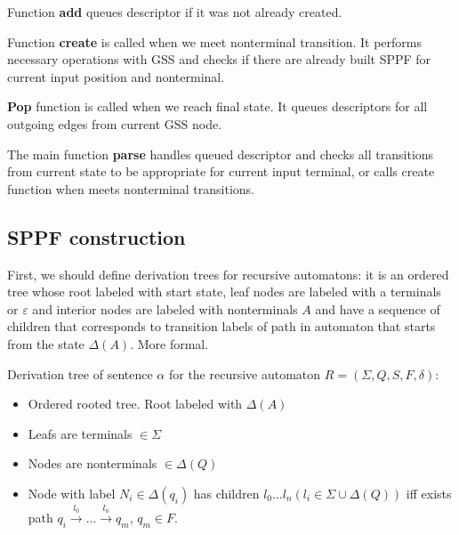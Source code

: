 \documentclass[runningheads,a4paper]{llncs}
\begin{document}

Function \textbf{add} queues descriptor if it was not already created.


Function \textbf{create} is called when we meet nonterminal transition.
It performs necessary operations with GSS and checks if there are already built SPPF for current
input position and nonterminal.

\textbf{Pop} function is called when we reach final state. It queues descriptors for all outgoing edges from current GSS node.



The main function \textbf{parse} handles queued descriptor and checks all transitions from current state to be appropriate
for current input terminal, or calls create function when meets nonterminal transitions.


\subsection{SPPF construction}

First, we should define derivation trees for recursive automatons: it is an ordered tree whose root labeled with start state,
leaf nodes are labeled with a terminals or $\varepsilon$ and interior nodes are labeled with 
nonterminals $A$ and have a sequence of children that corresponds to transition labels of path in 
automaton that starts from the state $\Delta(A)$. More formal. 

\begin{mydef}

Derivation tree of sentence $\alpha$ for the recursive automaton $R=(\Sigma, Q, S, F, \delta)$:%

\begin{itemize}
\item Ordered rooted tree. Root labeled with $\Delta(A)$
\item Leafs are terminals $\in \Sigma$
\item Nodes are nonterminals $\in \Delta(Q)$
\item Node with label $N_i \in \Delta(q_i)$ has children $l_0 \dots l_n (l_i \in \Sigma \cup \Delta(Q))$ iff exists
path
$q_i \xrightarrow[]{l_0} \dots \xrightarrow{l_n} q_m$, $q_m \in F$. 
\end{itemize}

\end{mydef}
\end{document}
